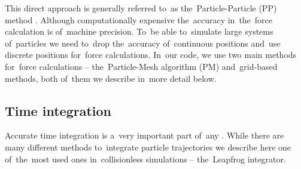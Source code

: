 This direct approach is generally referred to~as the~Particle-Particle (PP) method \parencite{Hockney:1988:CSU:62815}. Although computationally expensive the~accuracy in~the~force calculation is of~machine precision. To~be able to~simulate large systems of~particles we need to~drop the~accuracy of~continuous positions and~use discrete positions for~force calculations. In~our code, we use two main methods for~force calculations -- the~Particle-Mesh algorithm (PM) and~grid-based methods, both of~them we describe in~more detail below.
\subsection{Time integration}
Accurate time integration is a~very important part of~any \nbodysim. While there are many different methods to~integrate particle trajectories \parencite[see e.g.][]{Hockney:1988:CSU:62815} we describe here one of~the~most used ones in~collisionless simulations -- the~Leapfrog integrator.

